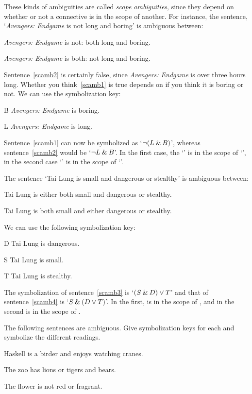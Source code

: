 These kinds of ambiguities are called \emph{scope ambiguities}, since they depend on whether or not a connective is in the scope of another. For instance, the sentence, `\emph{Avengers: Endgame} is not long and boring' is ambiguous between:
\begin{earg}
	\item[\ex{scamb1}] \emph{Avengers: Endgame} is not: both long and boring.
	\item[\ex{scamb2}] \emph{Avengers: Endgame} is both: not long and boring.
\end{earg}
Sentence~\ref{scamb2} is certainly false, since \emph{Avengers: Endgame} is over three hours long. Whether you think~\ref{scamb1} is true depends on if you think it is boring or not. We can use the symbolization key:
\begin{ekey}
	\item[B] \emph{Avengers: Endgame} is boring.
	\item[L] \emph{Avengers: Endgame} is long.
\end{ekey}
Sentence~\ref{scamb1} can now be symbolized as `$\neg(L \mathbin{\&} B)$', whereas sentence~\ref{scamb2} would be `$\neg L \mathbin{\&} B$'. In the first case, the `\eand' is in the scope of `\enot', in the second case `\enot' is in the scope of `\eand'.

The sentence `Tai Lung is small and dangerous or stealthy' is ambiguous between:
\begin{earg}
	\item[\ex{scamb3}] Tai Lung is either both small and dangerous or stealthy.
	\item[\ex{scamb4}] Tai Lung is both small and either dangerous or stealthy.
\end{earg}
We can use the following symbolization key:
\begin{ekey}
	\item[D] Tai Lung is dangerous.
	\item[S] Tai Lung is small.
	\item[T] Tai Lung is stealthy. 
\end{ekey}
The symbolization of sentence~\ref{scamb3} is `$(S \mathbin{\&} D) \vee T$' and that of sentence~\ref{scamb4} is `$S \mathbin{\&} (D \vee T)$'. In the first, \eand is in the scope of \eor, and in the second \eor is in the scope of \eand.

\practiceproblems
\solutions
\problempart The following sentences are ambiguous. Give symbolization keys for each and symbolize the different readings.
\begin{earg}
	\item Haskell is a birder and enjoys watching cranes.
	\item The zoo has lions or tigers and bears.
	\item The flower is not red or fragrant.
\end{earg}



